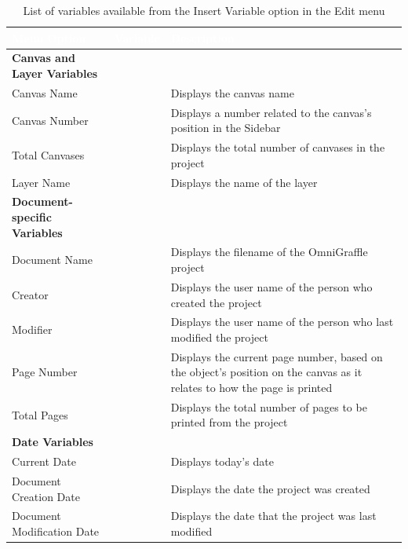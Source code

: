 \documentclass[../main.tex]{subfiles}
\begin{document}
\begin{xltabular}{0.85\textwidth}{|l|>{\raggedright\arraybackslash}X|>{\raggedright\arraybackslash}X|}
  \caption{List of variables available from the Insert Variable option in the Edit menu}\\
  \hline
  \textcolor{white}{\textbf{Menu Option}} & \textcolor{white}{\textbf{Variable}} &
  \textcolor{white}{\textbf{Description}} \\
  \hline
  \endhead
  \hline
  \endfoot
  \textbf{Canvas and Layer Variables} &  &  \\
  \hline
  Canvas Name &  & Displays the canvas name \\
  \hline
  Canvas Number &  & Displays a number related to the canvas's
  position in the Sidebar \\
  \hline
  Total Canvases &  & Displays the total number of canvases in
  the project \\
  \hline
  Layer Name &  & Displays the name of the layer \\
  \hline
  \textbf{Document-specific Variables} &  &  \\
  \hline
  Document Name &  & Displays the filename of the OmniGraffle
  project \\
  \hline
  Creator &  & Displays the user name of the person who created the
  project \\
  \hline
  Modifier &  & Displays the user name of the person who last
  modified the project \\
  \hline
  Page Number & \ogcellcode{<\%\#\%>} & Displays the current page number, based on the
  object's position on the canvas as it relates to how the page is printed \\
  \hline
  Total Pages &  & Displays the total number of pages to be
  printed from the project \\
  \hline
  \textbf{Date Variables} &  &  \\
  \hline
  Current Date &  & Displays today's date \\
  \hline
  Document Creation Date &  & Displays the date the project was
  created \\
  \hline
  Document Modification Date &  & Displays the date that
  the project was last modified \\

\end{xltabular}
\end{document}

